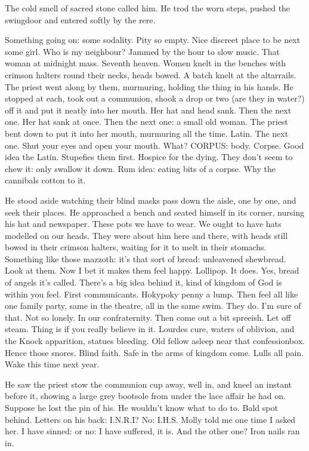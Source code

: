 The cold smell of sacred stone called him. He trod the worn steps,
pushed the swingdoor and entered softly by the rere.

Something going on: some sodality. Pity so empty. Nice discreet place
to be next some girl. Who is my neighbour? Jammed by the hour to slow
music. That woman at midnight mass. Seventh heaven. Women knelt in the
benches with crimson halters round their necks, heads bowed. A batch knelt
at the altarrails. The priest went along by them, murmuring, holding the
thing in his hands. He stopped at each, took out a communion, shook a
drop or two (are they in water?) off it and put it neatly into her mouth.
Her hat and head sank. Then the next one. Her hat sank at once. Then the
next one: a small old woman. The priest bent down to put it into her
mouth, murmuring all the time. Latin. The next one. Shut your eyes and
open your mouth. What? CORPUS: body. Corpse. Good idea the Latin.
Stupefies them first. Hospice for the dying. They don't seem to chew it:
only swallow it down. Rum idea: eating bits of a corpse. Why the cannibals
cotton to it.

He stood aside watching their blind masks pass down the aisle, one by
one, and seek their places. He approached a bench and seated himself in
its corner, nursing his hat and newspaper. These pots we have to wear. We
ought to have hats modelled on our heads. They were about him here and
there, with heads still bowed in their crimson halters, waiting for it to
melt in their stomachs. Something like those mazzoth: it's that sort of
bread: unleavened shewbread. Look at them. Now I bet it makes them feel
happy. Lollipop. It does. Yes, bread of angels it's called. There's a big
idea behind it, kind of kingdom of God is within you feel. First
communicants. Hokypoky penny a lump. Then feel all like one family party,
same in the theatre, all in the same swim. They do. I'm sure of that. Not
so lonely. In our confraternity. Then come out a bit spreeish. Let off
steam. Thing is if you really believe in it. Lourdes cure, waters of
oblivion, and the Knock apparition, statues bleeding. Old fellow asleep
near that confessionbox. Hence those snores. Blind faith. Safe in the arms
of kingdom come. Lulls all pain. Wake this time next year.

He saw the priest stow the communion cup away, well in, and kneel
an instant before it, showing a large grey bootsole from under the lace
affair he had on. Suppose he lost the pin of his. He wouldn't know what to
do to. Bald spot behind. Letters on his back: I.N.R.I? No: I.H.S.
Molly told me one time I asked her. I have sinned: or no: I have suffered,
it is. And the other one? Iron nails ran in.

